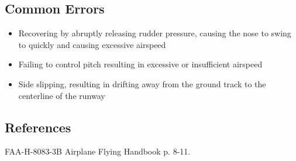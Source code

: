 \subsection{Common Errors}

\begin{itemize}
  \item Recovering by abruptly releasing rudder pressure, causing the nose to
    swing to quickly and causing excessive airspeed
  \item Failing to control pitch resulting in excessive or insufficient airspeed
  \item Side slipping, resulting in drifting away from the ground track to the
    centerline of the runway
\end{itemize}

\subsection{References}

FAA-H-8083-3B Airplane Flying Handbook p. 8-11.

